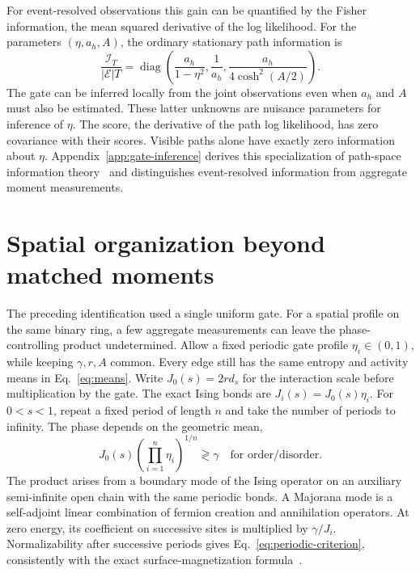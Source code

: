 \documentclass[aps,pre,reprint,amsmath,amssymb,longbibliography,floatfix]{revtex4-2}
\begin{document}
For event-resolved observations this gain can be quantified by the Fisher
information, the mean squared derivative of the log likelihood. For the
parameters $(\eta,a_h,A)$, the ordinary stationary path information is
\begin{equation}
 \frac{\mathcal I_T}{|\mathcal E|T}
 =\operatorname{diag}\left(
 \frac{a_h}{1-\eta^2},\frac1{a_h},\frac{a_h}{4\cosh^2(A/2)}\right).
 \label{eq:gate-fisher}
\end{equation}
The gate  can be inferred locally from the joint observations even when $a_h$ and
$A$ must also be estimated. These latter unknowns are nuisance parameters
for inference of $\eta$. The score, the derivative of the path log
likelihood, has zero covariance with their scores. Visible paths alone have exactly zero
information about $\eta$. Appendix~\ref{app:gate-inference} derives this
specialization of path-space information theory~\cite{Pantazis2013} and
distinguishes event-resolved information from aggregate moment measurements.

\section{Spatial organization beyond matched moments}
\label{sec:periodic-profiles}

The preceding identification used a single uniform gate. For a spatial profile on the same binary ring, a few aggregate
measurements can leave the phase-controlling product undetermined. Allow a fixed periodic gate profile $\eta_i\in(0,1)$,
while keeping $\gamma,r,A$ common. Every edge still has the same entropy
and activity means in Eq.~\eqref{eq:means}. Write
$J_0(s)=2rd_s$ for the interaction scale before multiplication by the
gate. The exact Ising bonds are $J_i(s)=J_0(s)\eta_i$.
For $0<s<1$, repeat a fixed period of length $n$ and take the number of periods to infinity. The phase depends on the geometric mean,
\begin{equation}
 J_0(s)\left(\prod_{i=1}^{n}\eta_i\right)^{1/n}
 \gtrless\gamma
 \quad\text{for order/disorder}.
 \label{eq:periodic-criterion}
\end{equation}
The product arises from a boundary mode of the Ising operator on an
auxiliary semi-infinite open chain with the same periodic bonds.
A Majorana mode is a self-adjoint linear combination of fermion creation
and annihilation operators. At zero energy, its coefficient on successive
sites is multiplied by $\gamma/J_i$. Normalizability after successive periods
gives Eq.~\eqref{eq:periodic-criterion}, consistently with the exact
surface-magnetization formula~\cite{IgloiRieger1998RandomWalks}.
\end{document}
